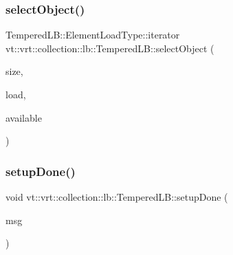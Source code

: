 \mbox{\label{structvt_1_1vrt_1_1collection_1_1lb_1_1_tempered_l_b_a191c3b0d3f7a06de4510b1c3370eabc2}} 
\subsubsection{\texorpdfstring{select\+Object()}{selectObject()}}
{\footnotesize\ttfamily Tempered\+L\+B\+::\+Element\+Load\+Type\+::iterator vt\+::vrt\+::collection\+::lb\+::\+Tempered\+L\+B\+::select\+Object (\begin{DoxyParamCaption}\item[{\hyperlink{structvt_1_1vrt_1_1collection_1_1lb_1_1_base_l_b_a215e22b9f12678303f49615ae3be05cc}{Load\+Type}}]{size,  }\item[{\hyperlink{structvt_1_1vrt_1_1collection_1_1lb_1_1_base_l_b_aa286d31a0820a8fc9218ccb858368fca}{Element\+Load\+Type} \&}]{load,  }\item[{std\+::set$<$ \hyperlink{structvt_1_1vrt_1_1collection_1_1lb_1_1_base_l_b_a790b22acf448880599724749cdc4e9b3}{Obj\+I\+D\+Type} $>$ const \&}]{available }\end{DoxyParamCaption})\hspace{0.3cm}{\ttfamily [protected]}}

\mbox{\label{structvt_1_1vrt_1_1collection_1_1lb_1_1_tempered_l_b_aace321948834284746579b4e87d60401}} 
\subsubsection{\texorpdfstring{setup\+Done()}{setupDone()}}
{\footnotesize\ttfamily void vt\+::vrt\+::collection\+::lb\+::\+Tempered\+L\+B\+::setup\+Done (\begin{DoxyParamCaption}\item[{\hyperlink{structvt_1_1vrt_1_1collection_1_1lb_1_1_tempered_l_b_a3e688a286b16334d43666bae581231b7}{Reduce\+Msg\+Type} $\ast$}]{msg }\end{DoxyParamCaption})\hspace{0.3cm}{\ttfamily [protected]}}

